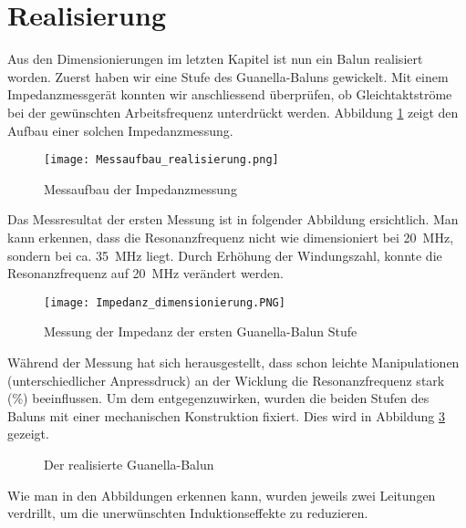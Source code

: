 \section{Realisierung}
Aus den Dimensionierungen im letzten Kapitel ist nun ein Balun realisiert worden. Zuerst haben wir eine Stufe des Guanella-Baluns gewickelt. Mit einem Impedanzmessgerät konnten wir anschliessend überprüfen, ob Gleichtaktströme bei der gewünschten Arbeitsfrequenz unterdrückt werden. Abbildung \ref{fig:mess_real} zeigt den Aufbau einer solchen Impedanzmessung.
\begin{figure}[H]
	\centering
	\texttt{[image: Messaufbau\_realisierung.png]}
	\caption{Messaufbau der Impedanzmessung}\label{fig:mess_real}
\end{figure}

Das Messresultat der ersten Messung ist in folgender Abbildung ersichtlich. Man kann erkennen, dass die Resonanzfrequenz nicht wie dimensioniert bei \SI{20}{MHz}, sondern bei ca. \SI{35}{MHz} liegt. Durch Erhöhung der Windungszahl, konnte die Resonanzfrequenz auf \SI{20}{MHz} verändert werden.
\begin{figure}[H]
	\centering
	\texttt{[image: Impedanz\_dimensionierung.PNG]}
	\caption{Messung der Impedanz der ersten Guanella-Balun Stufe}\label{fig:imp_dim}
\end{figure}

Während der Messung hat sich herausgestellt, dass schon leichte Manipulationen (unterschiedlicher Anpressdruck) an der Wicklung die Resonanzfrequenz stark (\%) beeinflussen. Um dem entgegenzuwirken, wurden die beiden Stufen des Baluns mit einer mechanischen Konstruktion fixiert. Dies wird in Abbildung \ref{fig:balun} gezeigt.
\begin{figure}[h!]
	\centering
	\qquad
	\qquad
	\caption{Der realisierte Guanella-Balun}
	\label{fig:balun}
\end{figure}
Wie man in den Abbildungen erkennen kann, wurden jeweils zwei Leitungen verdrillt, um die unerwünschten Induktionseffekte zu reduzieren.
